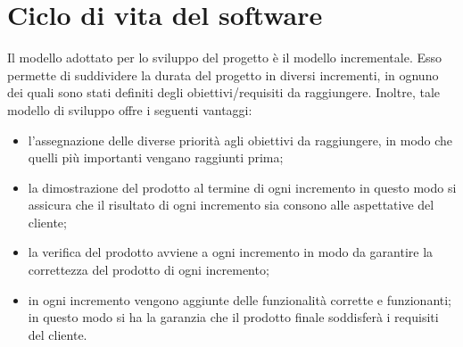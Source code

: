 

\section{Ciclo di vita del software}\label{sec:ciclo-vita-software}
Il modello adottato per lo sviluppo del progetto è il modello incrementale\cite{womak:ingegneria-software}.
Esso permette di suddividere la durata del progetto in diversi incrementi, in ognuno dei quali sono stati definiti degli obiettivi/requisiti da raggiungere.
Inoltre, tale modello di sviluppo offre i seguenti vantaggi:
\begin{itemize}
    \item l'assegnazione delle diverse priorità agli obiettivi da raggiungere, in modo che quelli più importanti vengano raggiunti prima;
    \item la dimostrazione del prodotto al termine di ogni incremento in questo modo si assicura che il risultato di ogni incremento sia consono alle aspettative del cliente;
    \item la verifica del prodotto avviene a ogni incremento in modo da garantire la correttezza del prodotto di ogni incremento;
    \item in ogni incremento vengono aggiunte delle funzionalità corrette e funzionanti; in questo modo si ha la garanzia che il prodotto finale soddisferà i requisiti del cliente.
\end{itemize}